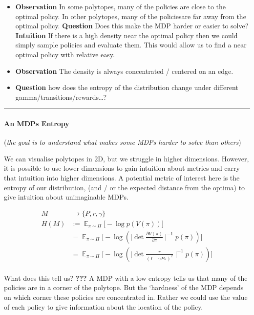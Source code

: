 \begin{itemize}
\item
  \textbf{Observation} In some polytopes, many of the policies are close
  to the optimal policy. In other polytopes, many of the policiesare far
  away from the optimal policy. \textbf{Question} Does this make the MDP
  harder or easier to solve? \textbf{Intuition} If there is a high
  density near the optimal policy then we could simply sample policies
  and evaluate them. This would allow us to find a near optimal policy
  with relative easy.
\item
  \textbf{Observation} The density is always concentrated / centered on
  an edge.
\item
  \textbf{Question} how does the entropy of the distribution change
  under different gamma/transitions/rewards\ldots{}?
\end{itemize}

\begin{center}\rule{0.5\linewidth}{\linethickness}\end{center}

\paragraph{An MDPs Entropy}

(\emph{the goal is to understand what makes some MDPs harder to solve
than others})

We can visualise polytopes in 2D, but we struggle in higher dimensions.
However, it is possible to use lower dimensions to gain intuition about
metrics and carry that intuition into higher dimensions. A potential
metric of interest here is the entropy of our distribution, (and / or
the expected distance from the optima) to give intuition about
unimaginable MDPs.

\begin{align}
M &\to \{P, r, \gamma\} \tag{a MDP}\\
H(M) &:= \mathop{\mathbb E}_{\pi\sim\Pi}\Big[-\log p(V(\pi)) \Big]\\
&= \mathop{\mathbb E}_{\pi\sim\Pi}\Big[-\log(\mid \det\frac{\partial V(\pi)}{\partial \pi}\mid^{-1}p(\pi)) \Big] \\
&= \mathop{\mathbb E}_{\pi\sim\Pi}\Big[-\log(\mid \det \frac{r}{(I-\gamma P \pi)^2}\mid^{-1}p(\pi)) \Big] \\
\end{align}

What does this tell us? \textbf{???} A MDP with a low entropy tells us
that many of the policies are in a corner of the polytope. But the
`hardness' of the MDP depends on which corner these policies are
concentrated in. Rather we could use the value of each policy to give
information about the location of the policy.

